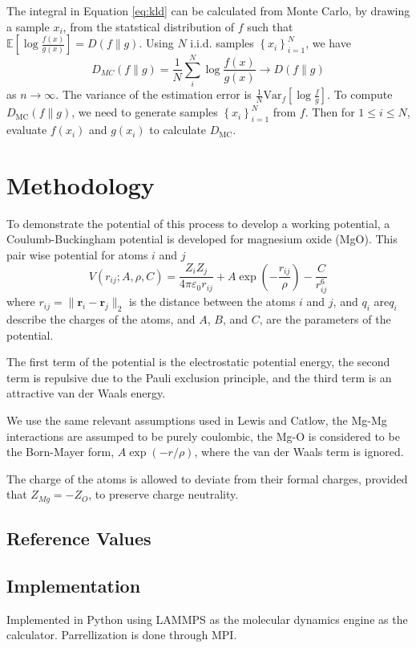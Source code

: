 The integral in Equation \ref{eq:kld} can be calculated from Monte Carlo\cite{hershey2007_kld_approx}, by drawing a sample $x_i$, from the statstical distribution of $f$ such that $\mathbb{E}\left[\log\frac{f(x)}{g(x)}\right] = D(f \parallel g)$.  Using $N$ i.i.d. samples $\left\{x_i\right\}_{i=1}^N$, we have
\begin{equation}
  \label{eq:kdmc}
  D_{MC}(f \parallel g) = \frac{1}{N}\sum_i^N \log \frac{f(x)}{g(x)}
      \rightarrow D(f \parallel g)
\end{equation}
as $n \rightarrow \infty$.  The variance of the estimation error is $\frac{1}{N}\mathrm{Var}_f\left[\log\frac{f}{g}\right]$.  To compute $D_{\mathrm{MC}}(f \parallel g)$, we need to generate samples $\left\{x_i\right\}_{i=1}^N$ from $f$.  Then for $1 \leq i \leq N$, evaluate $f(x_i)$ and $g(x_i)$ to calculate $D_{\mathrm{MC}}$.

\section{Methodology}
To demonstrate the potential of this process to develop a working potential, a Coulumb-Buckingham potential\cite{lewis1985_pot_buck_oxides} is developed for magnesium oxide (MgO).
This pair wise potential for atoms $i$ and $j$
\begin{equation}
    \label{eq:buck_eq}
    V(r_{ij};A,\rho,C)
        = \frac{Z_i Z_j}{4 \pi \varepsilon_0 r_{ij}}
            + A \exp(-\frac{r_{ij}}{\rho})
            - \frac{C}{r_{ij}^6}
\end{equation}
where $r_{ij} = \lVert \bm{r}_i - \bm{r}_j \rVert_2$ is the distance between the atoms $i$ and $j$, and $q_i$ are$q_i$ describe the charges of the atoms, and $A$, $B$, and $C$, are the parameters of the potential.

The first term of the potential is the electrostatic potential energy, the second term is repulsive due to the Pauli exclusion principle, and the third term is an attractive van der Waals energy.

We use the same relevant assumptions used in Lewis and Catlow\cite{lewis1985_pot_buck_oxides}, the Mg-Mg interactions are assumped to be purely coulombic, the Mg-O is considered to be the Born-Mayer form, $A \exp(-r/\rho)$, where the van der Waals term is ignored.

The charge of the atoms is allowed to deviate from their formal charges, provided that $Z_{Mg} = - Z_{O}$, to preserve charge neutrality.
\subsection{Reference Values}

\subsection{Implementation}
Implemented in Python using LAMMPS as the molecular dynamics engine as the calculator.  Parrellization is done through MPI.
